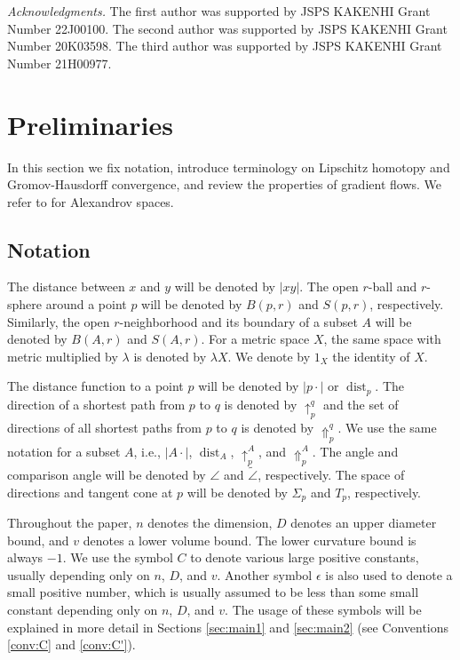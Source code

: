 \documentclass[a4paper,12pt]{amsart}
\theoremstyle{plain}
\theoremstyle{definition}
\numberwithin{thm}{section}
\numberwithin{equation}{section}
\DeclareMathOperator{\dist}{dist}
\newcommand{\step}[1]{\medskip\noindent\textit{#1.}}
\begin{document}
\step{Acknowledgments}
The first author was supported by JSPS KAKENHI Grant Number 22J00100.
The second author was supported by JSPS KAKENHI Grant Number 20K03598.
The third author was supported by JSPS KAKENHI Grant Number 21H00977.


\section{Preliminaries} \label{sec:pre}

In this section we fix notation, introduce terminology on Lipschitz homotopy and Gromov-Hausdorff convergence, and review the properties of gradient flows.
We refer to \cite{BGP} for Alexandrov spaces.

\subsection{Notation}

The distance between $x$ and $y$ will be denoted by $|xy|$.
The open $r$-ball and $r$-sphere around a point $p$ will be denoted by $B(p,r)$ and $S(p,r)$, respectively.
Similarly, the open $r$-neighborhood and its boundary of a subset $A$ will be denoted by $B(A,r)$ and $S(A,r)$.
For a metric space $X$, the same space with metric multiplied by $\lambda$ is denoted by $\lambda X$.
We denote by $1_X$ the identity of $X$.

The distance function to a point $p$ will be denoted by $|p\cdot|$ or $\dist_p$.
The direction of a shortest path from $p$ to $q$ is denoted by $\uparrow_p^q$ and the set of directions of all shortest paths from $p$ to $q$ is denoted by $\Uparrow_p^q$.
We use the same notation for a subset $A$, i.e., $|A\cdot|$, $\dist_A$, $\uparrow_p^A$, and $\Uparrow_p^A$.
The angle and comparison angle will be denoted by $\angle$ and $\tilde\angle$, respectively.
The space of directions and tangent cone at $p$ will be denoted by $\Sigma_p$ and $T_p$, respectively.

Throughout the paper, $n$ denotes the dimension, $D$ denotes an upper diameter bound, and $v$ denotes a lower volume bound.
The lower curvature bound is always $-1$.
We use the symbol $C$ to denote various large positive constants, usually depending only on $n$, $D$, and $v$.
Another symbol $\epsilon$ is also used to denote a small positive number, which is usually assumed to be less than some small constant depending only on $n$, $D$, and $v$.
The usage of these symbols will be explained in more detail in Sections \ref{sec:main1} and \ref{sec:main2} (see Conventions \ref{conv:C} and \ref{conv:C'}).
\end{document}
